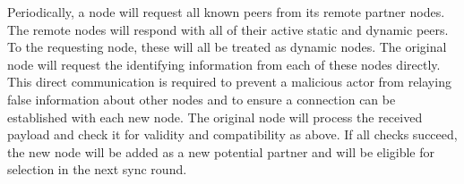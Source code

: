 Periodically, a node will request all known peers from its remote partner nodes.
The remote nodes will respond with all of their active static and dynamic peers.
To the requesting node, these will all be treated as dynamic nodes.
The original node will request the identifying information from each of these nodes directly.
This direct communication is required to prevent a malicious actor from relaying false information about other nodes and to ensure a connection can be established with each new node.
The original node will process the received payload and check it for validity and compatibility as above.
If all checks succeed, the new node will be added as a new potential partner and will be eligible for selection in the next sync round.
